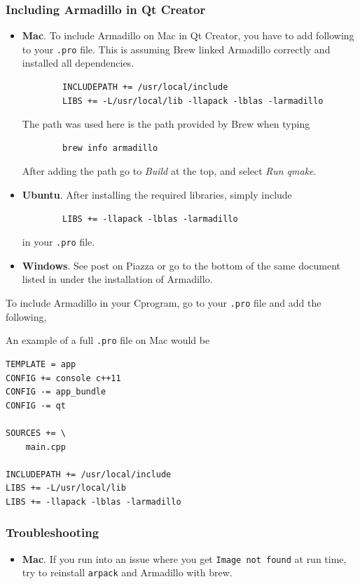 \documentclass[11pt]{article}
\newcommand{\CC}{C\nolinebreak\hspace{-.05em}\raisebox{.4ex}{\tiny\bf +}\nolinebreak\hspace{-.10em}\raisebox{.4ex}{\tiny\bf +}}
\def\CC{{C\nolinebreak[4]\hspace{-.05em}\raisebox{.4ex}{\tiny\bf ++}}}
\begin{document}
\subsubsection{Including Armadillo in Qt Creator}
\begin{itemize}
    \item \textbf{Mac}. To include Armadillo on Mac in Qt Creator, you have to add following to your \texttt{.pro} file. This is assuming Brew linked Armadillo correctly and installed all dependencies.
    \begin{lstlisting}
        INCLUDEPATH += /usr/local/include
        LIBS += -L/usr/local/lib -llapack -lblas -larmadillo
    \end{lstlisting}
    The path was used here is the path provided by Brew when typing 
    \begin{lstlisting}
        brew info armadillo
    \end{lstlisting}
    After adding the path go to \textit{Build} at the top, and select \textit{Run qmake}.
    \item \textbf{Ubuntu}. After installing the required libraries, simply include
    \begin{lstlisting}
        LIBS += -llapack -lblas -larmadillo
    \end{lstlisting}
    in your \texttt{.pro} file.
    \item \textbf{Windows}. See post on Piazza or go to the bottom of the same document listed in under the installation of Armadillo.
\end{itemize}
To include Armadillo in your \CC program, go to your \texttt{.pro} file and add the following,

An example of a full \texttt{.pro} file on Mac would be
\begin{lstlisting}
TEMPLATE = app
CONFIG += console c++11
CONFIG -= app_bundle
CONFIG -= qt

SOURCES += \
    main.cpp

INCLUDEPATH += /usr/local/include
LIBS += -L/usr/local/lib 
LIBS += -llapack -lblas -larmadillo
\end{lstlisting}

\subsubsection{Troubleshooting}
\begin{itemize}
    \item \textbf{Mac}. If you run into an issue where you get \texttt{Image not found} at run time, try to reinstall \texttt{arpack} and Armadillo with brew. 
\end{itemize}
\end{document}
